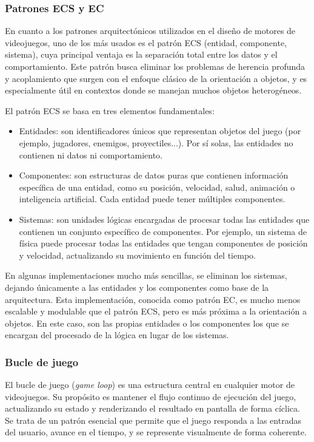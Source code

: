 \subsubsection{Patrones ECS y EC}
En cuanto a los patrones arquitectónicos utilizados en el diseño de motores de videojuegos, uno de los más usados es el patrón ECS (entidad, componente, sistema), cuya principal ventaja es la separación total entre los datos y el comportamiento. Este patrón busca eliminar los problemas de herencia profunda y acoplamiento que surgen con el enfoque clásico de la orientación a objetos, y es especialmente útil en contextos donde se manejan muchos objetos heterogéneos.

\medskip
El patrón ECS se basa en tres elementos fundamentales:
\begin{itemize}
	\item Entidades: son identificadores únicos que representan objetos del juego (por ejemplo, jugadores, enemigos, proyectiles...). Por sí solas, las entidades no contienen ni datos ni comportamiento.
	\item Componentes: son estructuras de datos puras que contienen información específica de una entidad, como su posición, velocidad, salud, animación o inteligencia artificial. Cada entidad puede tener múltiples componentes.
	\item Sistemas: son unidades lógicas encargadas de procesar todas las entidades que contienen un conjunto específico de componentes. Por ejemplo, un sistema de física puede procesar todas las entidades que tengan componentes de posición y velocidad, actualizando su movimiento en función del tiempo.
\end{itemize}

En algunas implementaciones mucho más sencillas, se eliminan los sistemas, dejando únicamente a las entidades y los componentes como base de la arquitectura. Esta implementación, conocida como patrón EC, es mucho menos escalable y modulable que el patrón ECS, pero es más próxima a la orientación a objetos. En este caso, son las propias entidades o los componentes los que se encargan del procesado de la lógica en lugar de los sistemas.

\subsubsection{Bucle de juego}
El bucle de juego (\textit{game loop}) es una estructura central en cualquier motor de videojuegos. Su propósito es mantener el flujo continuo de ejecución del juego, actualizando su estado y renderizando el resultado en pantalla de forma cíclica. Se trata de un patrón esencial que permite que el juego responda a las entradas del usuario, avance en el tiempo, y se represente visualmente de forma coherente.

